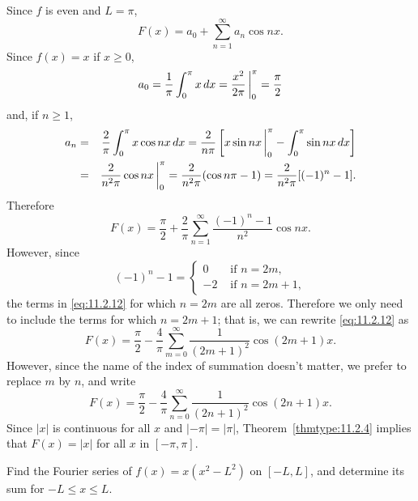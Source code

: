 \begin{examplesolution}
\solution Since $f$ is even and $L=\pi$,
\[
  F(x)=a_{0}+\sum_{n=1}^{\infty}a_{n}\cos nx.
\]
Since $f(x)=x$ if $x\ge0$,
\[
  a_{0}=\frac{1}{\pi}\int_{0}^{\pi}x\,dx=\frac{x^{2}}{2\pi}\,\bigg|_{0}^{\pi}=\frac{\pi}{2}
\]
and, if $n\ge1$,
\begin{eqnarray*}
  a_{n} & = & \frac{2}{\pi}\int_{0}^{\pi}x\cos nx\,dx=\frac{2}{n\pi}\left[x\sin nx\,\bigg|_{0}^{\pi}-\int_{0}^{\pi}\sin nx\,dx\right] \\
        & = & \frac{2}{n^{2}\pi}\cos nx\,\bigg|_{0}^{\pi}=\frac{2}{n^{2}\pi}(\cos n\pi-1)=\frac{2}{n^{2}\pi}[(-1)^{n}-1].
\end{eqnarray*}
Therefore
\begin{equation}
  \label{eq:11.2.12}F(x)=\frac{\pi}{2}+\frac{2}{\pi}\sum_{n=1}^{\infty}\frac{(-1)^{n}-1}{n^{2}}\cos nx.
\end{equation}
However, since
\[
  (-1)^{n}-1= \left\{
  \begin{array}{rl}
    0  & \mbox{ if }n=2m,   \\
    -2 & \mbox{ if }n=2m+1,
  \end{array}\right.
\]
the terms in \eqref{eq:11.2.12} for which $n=2m$ are all zeros. Therefore we only need to include the
terms for which $n=2m+1$; that is, we can rewrite \eqref{eq:11.2.12} as
\[
  F(x)=\frac{\pi}{2}-\frac{4}{\pi}\sum_{m=0}^{\infty}\frac{1}{(2m+1)^{2}}\cos(2m+1)x.
\]
However, since the name of the index of summation doesn't matter, we prefer to replace $m$ by $n$,
and write
\[
  F(x)=\frac{\pi}{2}-\frac{4}{\pi}\sum_{n=0}^{\infty}\frac{1}{(2n+1)^{2}}\cos(2n+1)x.
\]
Since $|x|$ is continuous for all $x$ and $|-\pi|=|\pi|$, Theorem~\ref{thmtype:11.2.4} implies that
$F(x)=|x|$ for all $x$ in $[-\pi,\pi]$.
\end{examplesolution}

\begin{example}
  \label{example:11.2.6} \rm Find the Fourier series of $f(x)=x(x^{2}-L^{2})$ on $[-L,L]$, and
  determine its sum for $-L\le x\le L$.
\end{example}


